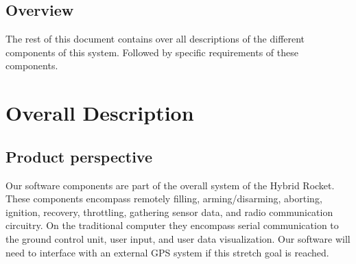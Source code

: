 \documentclass[10pt,draftclsnofoot,onecolumn,compsoc]{IEEEtran}
\begin{document}
\subsection{Overview}
The rest of this document contains over all descriptions of the different components of this system. Followed by specific requirements of these components.

\section{ Overall Description}
\subsection{ Product perspective}
Our software components are part of the overall system of the Hybrid Rocket. These components encompass remotely filling, arming/disarming, aborting, ignition, recovery, throttling, gathering sensor data, and radio communication circuitry.  On the traditional computer they encompass serial communication to the ground control unit, user input, and user data visualization. Our software will need to interface with an external GPS system if this stretch goal is reached. 
\end{document}
